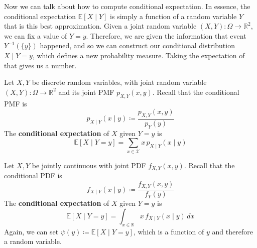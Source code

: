   Now we can talk about how to compute conditional expectation. In essence, the conditional expectation $\mathbb{E}[X \mid Y]$ is simply a function of a random variable $Y$ that is this best approximation. Given a joint random variable $(X, Y): \Omega \rightarrow \mathbb{R}^2$, we can fix a value of $Y = y$. Therefore, we are given the information that event $Y^{-1}(\{y\})$ happened, and so we can construct our conditional distribution $X \mid Y = y$, which defines a new probability measure. Taking the expectation of that gives us a number. 


  \begin{definition}[Discrete Conditional Expectation Given $Y = y$]
    Let $X, Y$ be discrete random variables, with joint random variable $(X, Y): \Omega \rightarrow \mathbb{R}^2$ and its joint PMF $p_{X, Y} (x, y)$. Recall that the conditional PMF is 
    \begin{equation}
      p_{X\mid Y}(x \mid y) \coloneqq \frac{p_{X, Y} (x, y)}{p_Y (y)}
    \end{equation}
    The \textbf{conditional expectation} of $X$ given $Y = y$ is 
    \begin{equation}
      \mathbb{E}[X \mid Y = y] = \sum_{x \in \mathcal{X}} x \, p_{X \mid Y} (x \mid y)
    \end{equation}
  \end{definition}

  \begin{definition}[Continuous Conditional Expectation Given $Y = y$]
    Let $X, Y$ be jointly continuous with joint PDF $f_{X, Y} (x, y)$. Recall that the conditional PDF is 
    \begin{equation}
      f_{X \mid Y} (x \mid y) \coloneqq \frac{f_{X, Y} (x, y)}{f_Y (y)}
    \end{equation}
    The \textbf{conditional expectation} of $X$ given $Y = y$ is 
    \begin{equation}
      \mathbb{E}[X \mid Y = y] = \int_{x \in \mathbb{R}} x \, f_{X \mid Y} (x \mid y) \, dx
    \end{equation}
    Again, we can set $\psi(y) \coloneqq \mathbb{E}[X \mid Y = y]$, which is a function of $y$ and therefore a random variable. 
  \end{definition}

